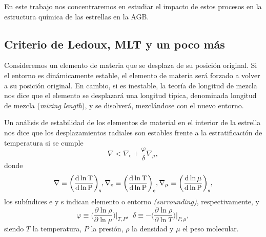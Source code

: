 \documentclass[baaa]{baaa}
\newcommand{\mmmb}[1]{\textcolor{teal}{[M3B: #1]}}
\begin{document}
En este trabajo nos concentraremos en estudiar el impacto de estos procesos en la estructura química de las estrellas en la AGB.


\subsection{Criterio de Ledoux, MLT y un poco más}

Consideremos un elemento de materia que se desplaza de su posición original. Si el entorno es dinámicamente estable, el elemento de materia será forzado a volver a su posición original. En cambio, si es inestable, la teoría de longitud de mezcla nos dice que el elemento se desplazará una longitud típica, denominada longitud de mezcla (\textit{mixing length}), y se disolverá, mezclándose con el nuevo entorno.

Un análisis de estabilidad de los elementos de material en el interior de la estrella nos dice que los desplazamientos radiales son estables frente a la estratificación de temperatura si se cumple
\begin{equation}
    \nabla < \nabla_\text{e} + \frac{\varphi}{\delta}\nabla_\mu,
\end{equation}
donde
\begin{eqnarray}
    \nabla\equiv \bigg(\frac{\rm d\ln T}{\rm d\ln P}\bigg)_\text{s},   \nabla_\text{e}\equiv \bigg(\frac{\rm \rm d\ln T}{\rm d\ln P}\bigg)_\text{e}, \nabla_\mu \equiv \bigg(\frac{\rm d\ln \mu}{\rm d\ln P}\bigg)_\text{s},
\end{eqnarray}
 los subíndices e y s indican elemento o entorno \textit{(surrounding)}, respectivamente, y
\begin{equation}
    \varphi \equiv \bigg (\frac{\partial\ln \rho}{\partial \ln \mu}\bigg)\bigg|_{T,P} , \ \ \delta\equiv -\bigg(\frac{\partial\ln\rho}{\partial\ln T}\bigg)\bigg|_{P,\mu},
\end{equation}
siendo $T$ la temperatura, $P$ la presión, $\rho$ la densidad y $\mu$ el peso molecular. 
\end{document}
